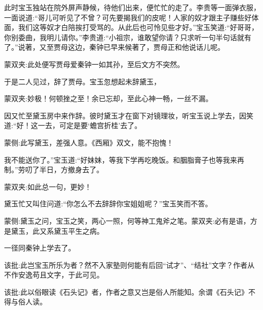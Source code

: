 \begin{parag}
    此时宝玉独站在院外屏声静候，待他们出来，便忙忙的走了。李贵等一面弹衣服，一面说道:“哥儿可听见了不曾？可先要揭我们的皮呢！人家的奴才跟主子赚些好体面，我们这等奴才白陪挨打受骂的。从此后也可怜见些才好。”宝玉笑道:“好哥哥，你别委曲，我明儿请你。”李贵道:“小祖宗，谁敢望你请？只求听一句半句话就有了。”说著，又至贾母这边，秦钟已早来候著了，贾母正和他说话儿呢。\begin{note}蒙双夹:此处便写贾母爱秦钟一如其孙，至后文方不突然。\end{note}于是二人见过，辞了贾母。宝玉忽想起未辞黛玉，\begin{note}蒙双夹:妙极！何顿挫之至！余已忘却，至此心神一畅，一丝不漏。\end{note}因又忙至黛玉房中来作辞。彼时黛玉才在窗下对镜理妆，听宝玉说上学去，因笑道:“好！这一去，可定是要‘蟾宫折桂’去了。\begin{note}蒙侧:此写黛玉，差强人意。《西厢》双文，能不抱愧！\end{note}我不能送你了。”宝玉道:“好妹妹，等我下学再吃晚饭。和胭脂膏子也等我来再制。”劳叨了半日，方撤身去了。\begin{note}蒙双夹:如此总一句，更妙！\end{note}黛玉忙又叫住问道:“你怎么不去辞辞你宝姐姐呢？”宝玉笑而不答。\begin{note}蒙侧:黛玉之问，宝玉之笑，两心一照，何等神工鬼斧之笔。蒙双夹:必有是语，方是黛玉，此又系黛玉平生之病。\end{note}一径同秦钟上学去了。\begin{note}该批:此岂宝玉所乐为者？然不入家塾则何能有后回“试才”、“结社”文字？作者从不作安逸苟且文字，于此可见。\end{note}\begin{note}该批:此以俗眼读《石头记》者，作者之意又岂是俗人所能知。余谓《石头记》不得与俗人读。\end{note}
\end{parag}


